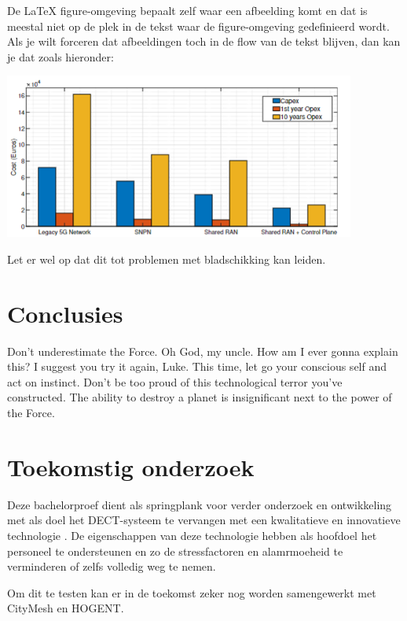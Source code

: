 \documentclass[a0,portrait]{hogent-poster}
\begin{document}
\begin{multicols}{2}
De {\LaTeX} figure-omgeving bepaalt zelf waar een afbeelding komt en dat is meestal niet op de plek in de tekst waar de figure-omgeving gedefinieerd wordt. Als je wilt forceren dat afbeeldingen toch in de flow van de tekst blijven, dan kan je dat zoals hieronder:

\begin{center}
  \captionsetup{type=figure}
  \includegraphics[width=1.0\linewidth]{./graphics/capex-opex.png}
\end{center}

Let er wel op dat dit tot problemen met bladschikking kan leiden.

\section{Conclusies}

Don't underestimate the Force. Oh God, my uncle. How am I ever gonna explain this? I suggest you try it again, Luke. This time, let go your conscious self and act on instinct. Don't be too proud of this technological terror you've constructed. The ability to destroy a planet is insignificant next to the power of the Force.

\section{Toekomstig onderzoek}

Deze bachelorproef dient als springplank voor verder onderzoek en ontwikkeling met als doel het DECT-systeem te vervangen met een kwalitatieve en innovatieve technologie . De eigenschappen van deze technologie hebben als hoofdoel het personeel te ondersteunen en zo de stressfactoren en alamrmoeheid te verminderen of zelfs volledig weg te nemen.

Om dit te testen kan er in de toekomst zeker nog worden samengewerkt met CityMesh en HOGENT. 

\end{multicols}
\end{document}

